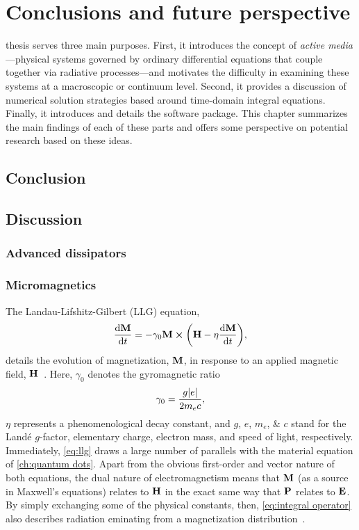 \chapter{\label{ch:conclusions}Conclusions and future perspective}

 thesis serves three main purposes.
First, it introduces the concept of \emph{active media}---physical systems governed by ordinary differential equations that couple together via radiative processes---and motivates the difficulty in examining these systems at a macroscopic or continuum level.
Second, it provides a discussion of numerical solution strategies based around time-domain integral equations.
Finally, it introduces and details the \QuEST{} software package.
This chapter summarizes the main findings of each of these parts and offers some perspective on potential research based on these ideas.

\section{Conclusion}


\section{Discussion}

\subsection{Advanced dissipators}

\subsection{Micromagnetics}

The Landau-Lifshitz-Gilbert (LLG) equation,
\begin{equation}
  \dv{\vb{M}}{t} = -\gamma_0 \vb{M} \cp \qty(\vb{H} - \eta \dv{\vb{M}}{t}),
  \label{eq:llg}
\end{equation}
details the evolution of magnetization, $\vb{M}$, in response to an applied magnetic field, $\vb{H}$~\cite{Aharoni2000}.
Here, $\gamma_0$ denotes the gyromagnetic ratio
\begin{equation}
  \gamma_0 = \frac{g \abs{e}}{2 m_e c},
  \label{eq:gyro}
\end{equation}
$\eta$ represents a phenomenological decay constant, and $g$, $e$, $m_e$, \& $c$ stand for the Land\'e $g$-factor, elementary charge, electron mass, and speed of light, respectively.
Immediately, \cref{eq:llg} draws a large number of parallels with the material equation of  \cref{ch:quantum dots}.
Apart from the obvious first-order and vector nature of both equations, the dual nature of electromagnetism means that $\vb{M}$ (as a source in Maxwell's equations) relates to $\vb{H}$ in the exact same way that $\vb{P}$ relates to $\vb{E}$.
By simply exchanging some of the physical constants, then, \cref{eq:integral operator} also describes radiation eminating from a magnetization distribution~\cite{Rothwell2009}.

